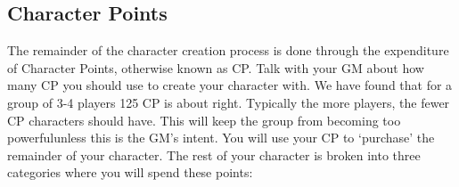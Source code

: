 \documentclass[twoside]{book}
\begin{document}
\subsection{Character Points}
     The remainder of the character creation process is
               done through the expenditure of Character Points,
               otherwise known as CP. Talk with your GM about how many CP
               you should use to create your character with. We have
               found that for a group of 3-4 players 125 CP is about
               right. Typically the more players, the fewer CP characters
               should have. This will keep the group from becoming too
               powerfulunless this is the GM's intent.
                You will use your CP to `purchase' the
               remainder of your character. The rest of your character is
               broken into three categories where you will spend these
               points: 
\end{document}
